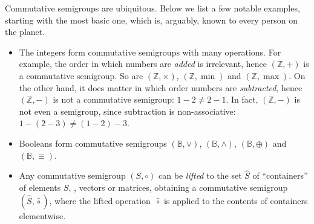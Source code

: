 \documentclass{toc}
\begin{document}
Commutative semigroups are ubiquitous. Below we list a few
notable examples, starting with the most basic one, %
which is, arguably, known to every person on the planet.  %

\begin{itemize}
\item %
    The integers  %
    form commutative semigroups with many operations. For
    example, the order in which numbers are \emph{added} is irrelevant, hence
    $(\mathbb{Z}, +)$ is a commutative semigroup. So are $(\mathbb{Z}, \times)$,
    $(\mathbb{Z}, \min)$ and $(\mathbb{Z}, \max)$.
    On the other hand, it does
    matter in which order numbers are \emph{subtracted}, hence $(\mathbb{Z}, -)$
    is not a commutative semigroup: $1-2 \neq 2-1$. In fact, $(\mathbb{Z}, -)$
    is not even a semigroup, since subtraction is non-associative:
    $1-(2-3) \neq (1-2)-3$.   %

    \item Booleans form commutative semigroups $(\mathbb{B}, \vee)$,
    $(\mathbb{B}, \wedge)$, $(\mathbb{B}, \oplus)$ and $(\mathbb{B}, \equiv)$.

    \item Any commutative semigroup $(S, \circ)$ can be \emph{lifted} to the set
      $\hat{S}$ of ``containers'' %
      of elements $S$, \eg, vectors or matrices,
    obtaining a commutative semigroup $(\hat{S}, \hat{\circ})$, where the lifted
    operation~$\hat{\circ}$ is applied to the contents of containers
    elementwise.  %


\end{itemize}
\end{document}

